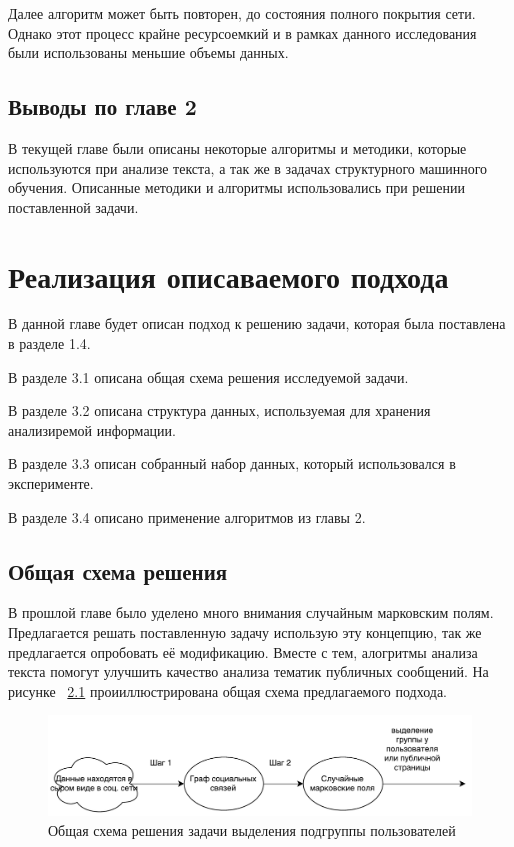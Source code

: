 \documentclass[annotation,times,page4]{itmo-student-thesis}
\begin{document}
Далее алгоритм может быть повторен, до состояния полного покрытия сети. Однако этот процесс крайне ресурсоемкий и в рамках данного исследования были использованы меньшие объемы данных.
 
\section{Выводы по главе 2}
В текущей главе были описаны некоторые алгоритмы и методики, которые используются при анализе текста, а так же в задачах структурного машинного обучения. Описанные методики и алгоритмы использовались при решении поставленной задачи.
 
\chapter{Реализация описаваемого подхода}
В данной главе будет описан подход к решению задачи, которая была поставлена в разделе 1.4.

В разделе 3.1 описана общая схема решения исследуемой задачи. 

В разделе 3.2 описана структура данных, используемая для хранения анализиремой информации. 

В разделе 3.3 описан собранный набор данных, который использовался в эксперименте.

В разделе 3.4 описано применение алгоритмов из главы 2.

\section{Общая схема решения}
В прошлой главе было уделено много внимания случайным марковским полям. Предлагается решать поставленную задачу использую эту концепцию, так же предлагается опробовать её модификацию. Вместе с тем, алогритмы анализа текста помогут улучшить качество анализа тематик публичных сообщений. На рисунке ~\ref{fig:plan} проииллюстрирована общая схема предлагаемого подхода.

\begin{figure}[!h]
\caption{Общая схема решения задачи выделения подгруппы пользователей}
\label{fig:plan}
\centering
\includegraphics[width=\textwidth]{figs/plan.pdf}
\end{figure}
\end{document}
